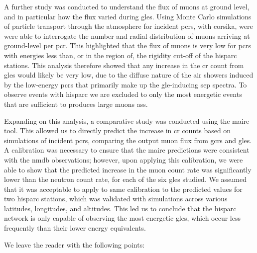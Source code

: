 A further study was conducted to understand the flux of muons at ground level, and in particular how the flux varied during \glspl{gle}. Using Monte Carlo simulations of particle transport through the atmosphere for incident \glspl{pcr}, with \gls{corsika}, were were able to interrogate the number and radial distribution of muons arriving at ground-level per \gls{pcr}. This highlighted that the flux of muons is very low for \glspl{pcr} with energies less than, or in the region of, the rigidity cut-off of the \gls{hisparc} stations. This analysis therefore showed that any increase in the \gls{cr} count from \glspl{gle} would likely be very low, due to the diffuse nature of the air showers induced by the low-energy \glspl{pcr} that primarily make up the \gls{gle}-inducing \gls{sep} spectra. To observe events with \gls{hisparc} we are excluded to only the most energetic events that are sufficient to produces large muons \glspl{as}.

Expanding on this analysis, a comparative study was conducted using the \gls{maire} tool. This allowed us to directly predict the increase in \gls{cr} counts based on simulations of incident \glspl{pcr}, comparing the output muon flux from \glspl{gcr} and \glspl{gle}. A calibration was necessary to ensure that the \gls{maire} predictions were consistent with the \gls{nmdb} observations; however, upon applying this calibration, we were able to show that the predicted increase in the muon count rate was significantly lower than the neutron count rate, for each of the six \glspl{gle} studied. We assumed that it was acceptable to apply to same calibration to the predicted values for two \gls{hisparc} stations, which was validated with simulations across various latitudes, longitudes, and altitudes. This led us to conclude that the \gls{hisparc} network is only capable of observing the most energetic \glspl{gle}, which occur less frequently than their lower energy equivalents.

We leave the reader with the following points:

